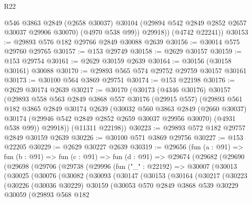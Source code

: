 \begin{lexlean}{R22}
\begin{coremodule}
            @546
            @3863
            @2849
            (@2658 @30037)
            @30104
            (@29894 @542 @2849 @2852 @2657 @30037 @29906 @30070)
            (@4970 @538 @99))
          @29918))
      (@4742 @22241))
@30153 := @29893 @576 @182 @29766 @2849 @30088 @2639
@30156 := @30014 @575 @29760 @29765
@30157 := @153 @29749
@30158 := @2629 @30157
@30159 := @153 @29754
@30161 := @2629 @30159 @2639
@30164 := @30156 (@30158 @30161) @30088
@30170 := @29893 @565 @574 @29752 @29759 @30157 @30161
@30173 := @30100 @564 @3869 @29751
@30174 := @153 @22198
@30176 := @2629 @30174 @2639
@30217 := @30170
    (@30173
      (@4346 @30176)
      @30157
      (@29893
        @558
        @563
        @2849
        @3868
        @557
        @30176
        (@29915 @557)
        (@29893
          @561
          @182
          @3865
          @2849
          @30174
          @2639
          (@30032
            @560
            @3863
            @2849
            (@2660 @30037)
            @30174
            (@29946 @542 @2849 @2852 @2659 @30037 @29956 @30070)
            (@4931 @538 @99))
          @29918))
      (@11311 @22198))
@30223 := @29893 @572 @182 @29757 @2849 @30159 @2639
@30226 := @30100 @571 @3869 @29756
@30227 := @153 @22205
@30229 := @2629 @30227 @2639
@30319 := @29656
    (fun (a : @91) =>
    fun (b : @91) =>
    fun (c : @91) =>
    fun (d : @91) =>
    @29674
      (@29682
        (@29690
          (@29698
            (@29706
              (@29738
                (@29996
                  (fun ("_" : @22192) =>
                  @30007
                    (@30013
                      (@30025
                        (@30076
                          (@30082
                            (@30093
                              (@30147
                                (@30153
                                  (@30164
                                    (@30217
                                      (@30223
                                        (@30226
                                          (@30036 @30229)
                                          @30159
                                          (@30053
                                            @570
                                            @2849
                                            @3868
                                            @539
                                            @30229
                                            @30059
                                            (@29893
                                              @568
                                              @182

\end{coremodule}
\end{lexlean}
